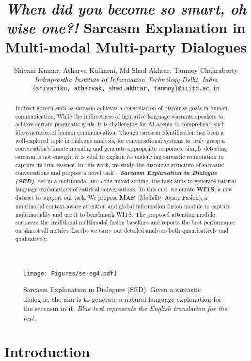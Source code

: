 \documentclass[11pt]{article}
\title{\textit{When did you become so smart, oh wise one?!} Sarcasm Explanation in Multi-modal Multi-party Dialogues}
\author{
    Shivani Kumar, Atharva Kulkarni, Md Shad Akhtar, Tanmoy Chakraborty \\
    \textit{Indraprastha Institute of Information Technology Delhi, India} \\
    \texttt{\{shivaniku, atharvak, shad.akhtar, tanmoy\}@iiitd.ac.in}
}
\newcommand{\dataset}{\textsc{WITS}}
\newcommand{\model}{\textsc{MAF}}
\newcommand{\task}{\textsc{SED}}
\begin{document}
\maketitle



\begin{abstract}
Indirect speech such as sarcasm achieves a constellation of discourse goals in human communication. While the indirectness of figurative language warrants speakers to achieve certain pragmatic goals, it is challenging for AI agents to comprehend such idiosyncrasies of human communication. Though sarcasm identification has been a well-explored topic in dialogue analysis, for conversational systems to truly grasp a conversation's innate meaning and generate appropriate responses, simply detecting sarcasm is not enough; it is vital to explain its underlying sarcastic connotation to capture its true essence. In this work, we study the discourse structure of sarcastic conversations and propose a novel task -- {\bf \em Sarcasm Explanation in Dialogue (\task)}. Set in a multimodal and code-mixed setting, the task aims to generate natural language explanations of satirical conversations. To this end, we curate \textbf{\dataset}, a new dataset to support our task. We propose \textbf{\model}\ (Modality Aware Fusion), a multimodal context-aware attention and global information fusion module to capture multimodality and use it to benchmark \dataset. The proposed attention module surpasses the traditional multimodal fusion baselines and reports the best performance on almost all metrics. Lastly, we carry out detailed analyses both quantitatively and qualitatively.

\end{abstract}


\vspace{-1em}
\begin{figure}
    \centering
    \texttt{[image: Figures/se-eg4.pdf]}
    \caption{Sarcasm Explanation in Dialogues (\task). Given a sarcastic dialogue, the aim is to generate a natural language explanation for the sarcasm in it. \textit{\color{blue}Blue text represents the English translation for the text.}}
    \label{fig:se_eg}
    \vspace{-5mm}
\end{figure}

\section{Introduction}
\end{document}
